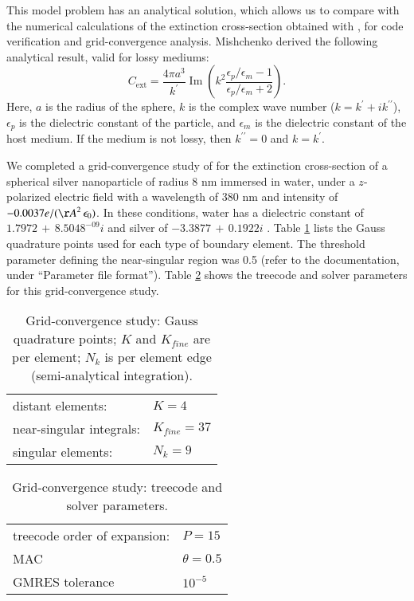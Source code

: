 This model problem has an analytical solution, which allows us to compare with
the numerical calculations of the extinction cross-section obtained with \pygbe,
for code verification and grid-convergence analysis.
Mishchenko \cite{Mishchenko2007} derived the following analytical result, 
valid for lossy mediums:
%
\begin{equation} 
    C_\text{ext} = \frac{4\pi a^3}{k^\prime} \operatorname{Im}\left(k^2 
                    \frac{\epsilon_p/\epsilon_m -1}{\epsilon_p/\epsilon_m +2}\right).
    \label{eq:an_sol}
\end{equation}
%
Here, $a$ is the radius of the sphere, $k$ is the complex wave number ($k=k^\prime +i k^{\prime\prime}$), $\epsilon_p$ 
is the dielectric constant of the particle, and $\epsilon_m$ is the dielectric constant
of the host medium. If the medium is not lossy, then $k^{\prime\prime}=0$ and $k=k^\prime$.

We completed a grid-convergence study of \pygbe for the extinction
cross-section of a spherical silver nanoparticle of radius 8 nm immersed in water,
under a $z$-polarized electric field with a wavelength of 380 nm and intensity of 
$-0.0037 e/({\AA}^2 \, \epsilon_0)$. In these conditions, water has a dielectric
constant of $1.7972 \, + \, 8.5048^{-09}i$ \cite{JohnsonChristy1972} and silver of
$-3.3877 \, + \, 0.1922i$ \cite{HaleQuerry1972}. 
Table \ref{table:quadparams1} lists the Gauss quadrature points used for each type of boundary element. 
The threshold parameter defining the near-singular region was 0.5 
(refer to the \pygbe documentation, under ``Parameter file format'').
Table \ref{table:treeparams1} shows the treecode and solver parameters for this grid-convergence study.

\begin{table}[h]
    \centering
    \caption{\label{table:quadparams1} Grid-convergence study: Gauss quadrature points; 
    $K$ and $K_{fine}$ are per element; $N_k $ is per element edge (semi-analytical integration). } 
    \begin{tabular}{l l}
    \hline%
     distant elements: & $K=4$ \\
     near-singular integrals:   & $ K_{fine}=37$ \\
     singular elements:  & $N_k =9$ \\
    \hline%
    \end{tabular}
\end{table}


\begin{table}[h]
    \centering
    \caption{\label{table:treeparams1} Grid-convergence study: treecode and solver parameters.} 
    \begin{tabular}{l l}
    \hline%
    treecode order of expansion: & $P=15$\\
    MAC                                         & $\theta=0.5$\\
    GMRES tolerance                    & $10^{-5}$\\
    \hline%
    \end{tabular}
\end{table}

